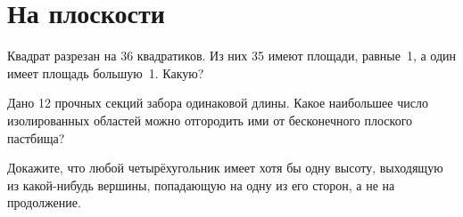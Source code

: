 \section{На плоскости}
\begin{itemize}

\itA Квадрат разрезан на 36 квадратиков. Из них 35 имеют площади, равные~1, а один имеет площадь большую~1. Какую?

\itB Дано 12 прочных секций забора одинаковой длины. Какое наибольшее число изолированных областей можно отгородить ими от бесконечного плоского пастбища?

\itC Докажите, что любой четырёхугольник имеет хотя бы одну высоту, выходящую из какой-нибудь вершины, попадающую на одну из его сторон, а не на продолжение.
\end{itemize}